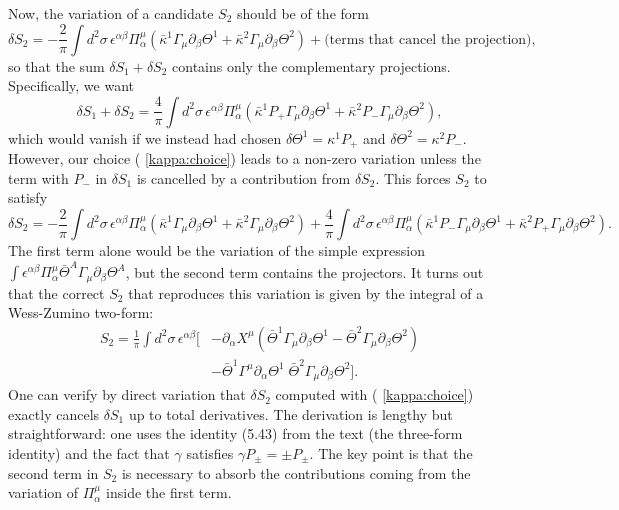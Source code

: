 \documentclass[12pt]{article}
\newcommand{\cbar}{\bar{\kappa}}
\begin{document}
Now, the variation of a candidate $S_2$ should be of the form
\[
\delta S_2 = -\frac{2}{\pi}\int d^2\sigma\, \epsilon^{\alpha\beta} \Pi^\mu_\alpha \left( \cbar^1 \Gamma_\mu \partial_\beta\Theta^1 + \cbar^2 \Gamma_\mu \partial_\beta\Theta^2 \right) + \text{(terms that cancel the projection)},
\]
so that the sum $\delta S_1+\delta S_2$ contains only the complementary projections. Specifically, we want
\[
\delta S_1 + \delta S_2 = \frac{4}{\pi}\int d^2\sigma\, \epsilon^{\alpha\beta} \Pi^\mu_\alpha \left( \cbar^1 P_+ \Gamma_\mu \partial_\beta\Theta^1 + \cbar^2 P_- \Gamma_\mu \partial_\beta\Theta^2 \right),
\]
which would vanish if we instead had chosen $\delta\Theta^1 = \kappa^1 P_+$ and $\delta\Theta^2 = \kappa^2 P_-$. However, our choice ( \ref{kappa:choice}) leads to a non-zero variation unless the term with $P_-$ in $\delta S_1$ is cancelled by a contribution from $\delta S_2$. This forces $S_2$ to satisfy
\[
\delta S_2 = -\frac{2}{\pi}\int d^2\sigma\, \epsilon^{\alpha\beta} \Pi^\mu_\alpha \left( \cbar^1 \Gamma_\mu \partial_\beta\Theta^1 + \cbar^2 \Gamma_\mu \partial_\beta\Theta^2 \right) + \frac{4}{\pi}\int d^2\sigma\, \epsilon^{\alpha\beta} \Pi^\mu_\alpha \left( \cbar^1 P_- \Gamma_\mu \partial_\beta\Theta^1 + \cbar^2 P_+ \Gamma_\mu \partial_\beta\Theta^2 \right).
\]
The first term alone would be the variation of the simple expression $\int \epsilon^{\alpha\beta}\Pi^\mu_\alpha \bar{\Theta}^A\Gamma_\mu\partial_\beta\Theta^A$, but the second term contains the projectors. It turns out that the correct $S_2$ that reproduces this variation is given by the integral of a Wess-Zumino two-form:
\begin{align}
S_2 = \frac{1}{\pi}\int d^2\sigma\, \epsilon^{\alpha\beta}\bigg[ & -\partial_\alpha X^\mu \left(\bar{\Theta}^1\Gamma_\mu\partial_\beta\Theta^1 - \bar{\Theta}^2\Gamma_\mu\partial_\beta\Theta^2\right) \nonumber\\
& - \bar{\Theta}^1\Gamma^\mu\partial_\alpha\Theta^1\; \bar{\Theta}^2\Gamma_\mu\partial_\beta\Theta^2 \bigg]. \label{S2}
\end{align}
One can verify by direct variation that $\delta S_2$ computed with ( \ref{kappa:choice}) exactly cancels $\delta S_1$ up to total derivatives. The derivation is lengthy but straightforward: one uses the identity (5.43) from the text (the three-form identity) and the fact that $\gamma$ satisfies $\gamma P_\pm = \pm P_\pm$. The key point is that the second term in $S_2$ is necessary to absorb the contributions coming from the variation of $\Pi^\mu_\alpha$ inside the first term.
\end{document}
